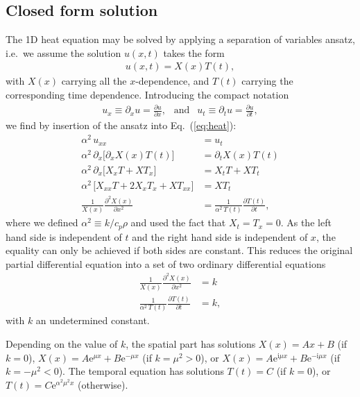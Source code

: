 \documentclass[a4paper, twocolumn]{article}
\newcommand{\eq} [1]{Eq.\ (\ref{eq:#1})}
\begin{document}
\subsection{Closed form solution}
The 1D heat equation may be solved by applying a separation of variables ansatz, i.e.\ we assume the solution $u(x,t)$ takes the form
\begin{align}
u(x,t) = X(x)T(t), 
\end{align}
with $X(x)$ carrying all the $x$-dependence, and $T(t)$ carrying the corresponding time dependence. Introducing the compact notation 
\begin{align}
u_{x} \equiv \partial_x u =  \frac{\partial u}{\partial x}, \ \ \text{ and } \ \ u_t \equiv \partial_t u =  \frac{\partial u}{\partial t}, 
\end{align}
we find by insertion of the ansatz into \eq{heat}:
\begin{align}
\alpha^2\, u_{xx} &= u_t \nonumber \\
%
\alpha^2\, \partial_x \Big[\partial_x  X(x)T(t) \Big] &= \partial_t X(x)T(t) \nonumber \\
%
\alpha^2\, \partial_x \Big[ X_x T + XT_x \Big] &= X_tT+XT_t \nonumber \\
%
\alpha^2\, \Big[X_{xx}T + 2X_xT_x + XT_{xx}\Big]&= XT_t \nonumber \\
\frac{1}{X(x)} \frac{\partial^2 X(x)}{\partial x^2} &= \frac{1}{\alpha^2\,T(t)}\frac{\partial T(t)}{\partial t},
\end{align}
where we defined $\alpha^2\equiv k/c_p\rho$ and used the fact that $X_t=T_x=0$. As the left hand side is independent of $t$ and the right hand side is independent of $x$, the equality can only be achieved if both sides are constant. This reduces the original partial differential equation into a set of two ordinary differential equations 
\begin{align}
\frac{1}{X(x)}\frac{\partial^2X(x)}{\partial x^2}&=k  \label{eq:X(x)}\\
%
\frac{1}{\alpha^2\,T(t)}\frac{\partial T(t)}{\partial t}&=k, \label{eq:T(t)}
\end{align} 
with $k$ an undetermined constant. 

Depending on the value of $k$, the spatial part has solutions $X(x)=Ax+B$ (if $k=0$), $X(x)=A\mathrm{e}^{\mu x}+B\mathrm{e}^{-\mu x}$ (if $k=\mu^2>0$), or $X(x)=A\mathrm{e}^{\mathrm{i}\mu x}+B\mathrm{e}^{-\mathrm{i}\mu x}$ (if $k=-\mu^2<0$). The temporal equation has solutions $T(t)=C$ (if $k=0$), or $T(t)=C\mathrm{e}^{\alpha^2\mu^2 x}$ (otherwise).
\end{document}
